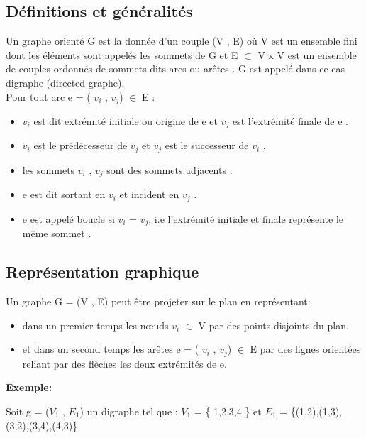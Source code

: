 
		\subsection{Définitions et généralités}
		Un graphe orienté G est la donnée d'un couple (V , E) où
		V est un ensemble fini dont les éléments sont appelés les sommets de G et 
		E  $\subset$ V x V est un ensemble de couples ordonnés de sommets dits arcs ou arêtes \citep{muller}. G est appelé dans ce cas digraphe (directed graphe).\\
		 Pour tout arc e = ( $v_{i}$ , $v_{j}$) $\in$ E :
		 \begin{itemize}  
			\item $v_{i}$ est dit extrémité initiale ou origine de e et $v_{j}$ est l'extrémité finale de e \citep{muller}.
			
			\item $v_{i}$ est le prédécesseur de $v_{j}$ et $v_{j}$ est le successeur de $v_{i}$ \citep{IUTLyonInformatique}.
			
			\item les sommets $v_{i}$ , $v_{j}$ sont des sommets adjacents \citep{Pres}.
			
			\item e est dit sortant en $v_{i}$ et incident en $v_{j}$ \citep{Pres}.
			
			\item e est appelé boucle si $v_{i}$ = $v_{j}$, i.e l'extrémité initiale et finale représente le même sommet \citep{IUTLyonInformatique}.
			
		\end{itemize}
		 
		
		\subsection{Représentation graphique}
		
		
		Un graphe G = (V , E) peut être projeter sur le plan en représentant:
		\begin{itemize} 
		\item dans un premier temps les nœuds $v_{i}$ $\in$ V par des points disjoints du plan.
		\item et dans un second temps les arêtes e = ( $v_{i}$ , $v_{j}$) $\in$ E par des lignes orientées reliant par des flèches les deux extrémités de e. 
		\end{itemize}
		
		\textbf{Exemple:}
		
		Soit g = ($V_{1}$ , $E_{1}$) un digraphe tel que : $V_{1}$ = \{ 1,2,3,4 \} et  $E_{1}$ = \{(1,2),(1,3),(3,2),(3,4),(4,3)\}.
		
